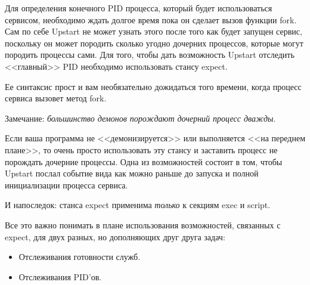Для определения конечного PID процесса, который будет использоваться сервисом, необходимо ждать долгое время пока он сделает вызов функции fork. Сам по себе Upstart не может узнать этого после того как будет запущен сервис, поскольку он может породить сколько угодно дочерних процессов, которые могут породить процессы сами. Для того, чтобы дать возможность Upstart отследить <<главный>> PID необходимо использовать стансу expect.

Ее синтаксис прост и вам необязательно дожидаться того времени, когда процесс сервиса вызовет метод fork.

Замечание: \textit{большинство демонов порождают дочерний процесс дважды}.

Если ваша программа не <<демонизируется>> или выполняется <<на переднем плане>>, то очень просто использовать эту стансу и заставить процесс не порождать дочерние процессы. Одна из возможностей состоит в том, чтобы Upstart послал событие вида  как можно раньше до запуска и полной инициализации процесса сервиса. 

И напоследок: станса expect применима \textit{только} к секциям exec и script.

Все это важно понимать в плане использования возможностей, связанных с expect, для двух разных, но дополняющих друг друга задач: \begin{itemize}
\item Отслеживания готовности служб.
\item Отслеживания PID'ов. 
\end{itemize} 